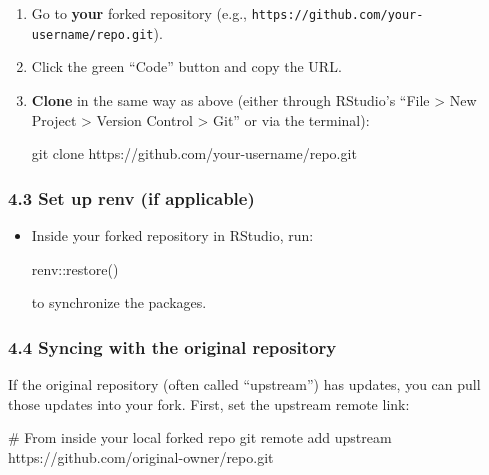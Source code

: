 \documentclass[
  letterpaper,
  DIV=11,
  numbers=noendperiod]{scrartcl}
\newenvironment{Shaded}{\begin{snugshade}}{\end{snugshade}}
\newcommand{\CommentTok}[1]{\textcolor[rgb]{0.37,0.37,0.37}{#1}}
\newcommand{\FunctionTok}[1]{\textcolor[rgb]{0.28,0.35,0.67}{#1}}
\newcommand{\NormalTok}[1]{\textcolor[rgb]{0.00,0.23,0.31}{#1}}
\newcommand{\SpecialCharTok}[1]{\textcolor[rgb]{0.37,0.37,0.37}{#1}}
\begin{document}
\begin{enumerate}
\def\labelenumi{\arabic{enumi}.}
\item
  Go to \textbf{your} forked repository (e.g.,
  \texttt{https://github.com/your-username/repo.git}).\\
\item
  Click the green ``Code'' button and copy the URL.\\
\item
  \textbf{Clone} in the same way as above (either through RStudio's
  ``File \textgreater{} New Project \textgreater{} Version Control
  \textgreater{} Git'' or via the terminal):

\begin{Shaded}
\begin{Highlighting}[]
\FunctionTok{git}\NormalTok{ clone https://github.com/your{-}username/repo.git}
\end{Highlighting}
\end{Shaded}
\end{enumerate}

\subsubsection{4.3 Set up renv (if
applicable)}\label{set-up-renv-if-applicable}

\begin{itemize}
\item
  Inside your forked repository in RStudio, run:

\begin{Shaded}
\begin{Highlighting}[]
\NormalTok{renv}\SpecialCharTok{::}\FunctionTok{restore}\NormalTok{()}
\end{Highlighting}
\end{Shaded}

  to synchronize the packages.
\end{itemize}

\subsubsection{4.4 Syncing with the original
repository}\label{syncing-with-the-original-repository}

If the original repository (often called ``upstream'') has updates, you
can pull those updates into your fork. First, set the upstream remote
link:

\begin{Shaded}
\begin{Highlighting}[]
\CommentTok{\# From inside your local forked repo}
\FunctionTok{git}\NormalTok{ remote add upstream https://github.com/original{-}owner/repo.git}
\end{Highlighting}
\end{Shaded}
\end{document}

